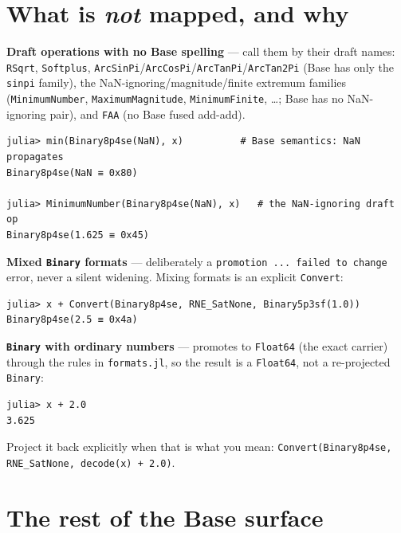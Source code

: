\section{What is \emph{not} mapped, and why}



\label{2392765366633338434}{}


\textbf{Draft operations with no Base spelling} — call them by their draft names: \texttt{RSqrt}, \texttt{Softplus}, \texttt{ArcSinPi}/\texttt{ArcCosPi}/\texttt{ArcTanPi}/\texttt{ArcTan2Pi} (Base has only the \texttt{sinpi} family), the NaN-ignoring/magnitude/finite extremum families (\texttt{MinimumNumber}, \texttt{MaximumMagnitude}, \texttt{MinimumFinite}, …; Base has no NaN-ignoring pair), and \texttt{FAA} (no Base fused add-add).




\begin{verbatim}
julia> min(Binary8p4se(NaN), x)          # Base semantics: NaN propagates
Binary8p4se(NaN ≡ 0x80)

julia> MinimumNumber(Binary8p4se(NaN), x)   # the NaN-ignoring draft op
Binary8p4se(1.625 ≡ 0x45)
\end{verbatim}



\textbf{Mixed \texttt{Binary} formats} — deliberately a \texttt{promotion ... failed to change} error, never a silent widening. Mixing formats is an explicit \texttt{Convert}:




\begin{verbatim}
julia> x + Convert(Binary8p4se, RNE_SatNone, Binary5p3sf(1.0))
Binary8p4se(2.5 ≡ 0x4a)
\end{verbatim}



\textbf{\texttt{Binary} with ordinary numbers} — promotes to \texttt{Float64} (the exact carrier) through the rules in \texttt{formats.jl}, so the result is a \texttt{Float64}, not a re-projected \texttt{Binary}:




\begin{verbatim}
julia> x + 2.0
3.625
\end{verbatim}



Project it back explicitly when that is what you mean: \texttt{Convert(Binary8p4se, RNE\_SatNone, decode(x) + 2.0)}.



\section{The rest of the Base surface}



